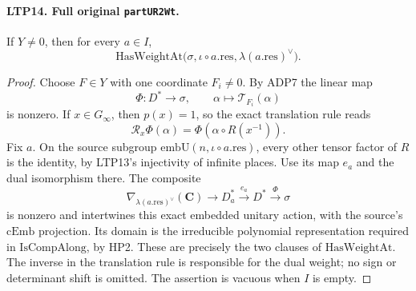 \documentclass[11pt,a4paper]{article}
\numberwithin{equation}{section}
\theoremstyle{remark}\newtheorem{remark}[theorem]{Remark}
\begin{document}
\paragraph{LTP14. Full original \texttt{part\allowbreak UR2Wt}.}
\label{claim:LTP14}
If \(Y\ne0\), then for every \(a\in I\),
\[
   \mathrm{HasWeightAt}
       \bigl(\sigma,\iota\circ a.\mathrm{res},
                         \lambda(a.\mathrm{res})^\vee\bigr).
\]
\begin{proof}
Choose \(F\in Y\) with one coordinate \(F_i\ne0\).  By ADP7
the linear map
\[
                 \Phi:D^*\longrightarrow\sigma,\qquad
                        \alpha\longmapsto\mathcal T_{F_i}(\alpha)
\]
is nonzero.  If \(x\in G_\infty\), then \(p(x)=1\), so the
exact translation rule reads
\[
       \mathscr R_x\Phi(\alpha)
                         =\Phi(\alpha\circ R(x^{-1})).
\]
Fix \(a\).  On the source subgroup
\(\mathrm{embU}(n,\iota\circ a.\mathrm{res})\), every other
tensor factor of \(R\) is the identity, by LTP13's injectivity
of infinite places.  Use its map \(e_a\) and the dual
isomorphism there.  The composite
\[
 \nabla_{\lambda(a.\mathrm{res})^\vee}(\mathbf C)
       \longrightarrow D_a^*
       \xrightarrow{e_a}D^*
       \xrightarrow{\Phi}\sigma
\]
is nonzero and intertwines this exact embedded unitary action,
with the source's \(\mathrm{cEmb}\) projection.
Its domain is the irreducible polynomial representation
required in \(\mathrm{IsCompAlong}\), by HP2.
These are precisely the two clauses of
\(\mathrm{HasWeightAt}\).  The inverse in the translation rule
is responsible for the dual weight; no sign or determinant shift
is omitted.  The assertion is vacuous when \(I\) is empty.
\end{proof}

\end{document}
